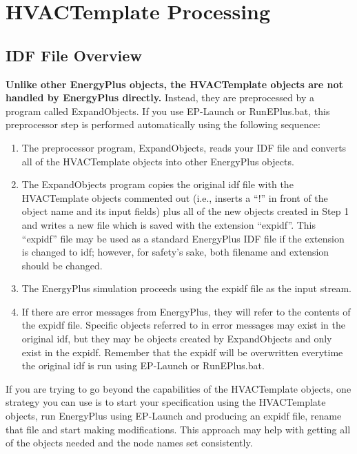 \section{HVACTemplate Processing}\label{hvactemplate-processing}

\subsection{IDF File Overview}

\textbf{Unlike other EnergyPlus objects, the HVACTemplate objects are not handled by EnergyPlus directly.} Instead, they are preprocessed by a program called ExpandObjects. If you use EP-Launch or RunEPlus.bat, this preprocessor step is performed automatically using the following sequence:

\begin{enumerate}
\def\labelenumi{\arabic{enumi})}
\item
  The preprocessor program, ExpandObjects, reads your IDF file and converts all of the HVACTemplate objects into other EnergyPlus objects.
\item
  The ExpandObjects program copies the original idf file with the HVACTemplate objects commented out (i.e., inserts a ``!'' in front of the object name and its input fields) plus all of the new objects created in Step 1 and writes a new file which is saved with the extension ``expidf''. This ``expidf'' file may be used as a standard EnergyPlus IDF file if the extension is changed to idf; however, for safety's sake, both filename and extension should be changed.
\item
  The EnergyPlus simulation proceeds using the expidf file as the input stream.
\item
  If there are error messages from EnergyPlus, they will refer to the contents of the expidf file. Specific objects referred to in error messages may exist in the original idf, but they may be objects created by ExpandObjects and only exist in the expidf. Remember that the expidf will be overwritten everytime the original idf is run using EP-Launch or RunEPlus.bat.
\end{enumerate}

If you are trying to go beyond the capabilities of the HVACTemplate objects, one strategy you can use is to start your specification using the HVACTemplate objects, run EnergyPlus using EP-Launch and producing an expidf file, rename that file and start making modifications. This approach may help with getting all of the objects needed and the node names set consistently.

